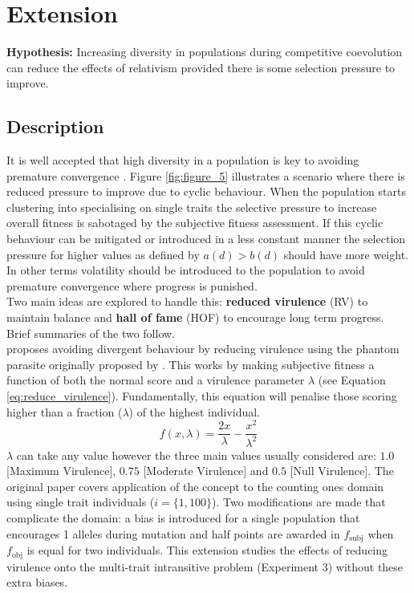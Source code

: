 \documentclass[11pt,a4paper]{article}
\begin{document}
\section{Extension}
\noindent \textbf{Hypothesis:} Increasing diversity in populations during competitive coevolution can reduce the effects of relativism provided there is some selection pressure to improve. \\

\subsection{Description}
It is well accepted that high diversity in a population is key to avoiding premature convergence \parencite{Chong:2009}. Figure \ref{fig:figure_5} illustrates a scenario where there is reduced pressure to improve due to cyclic behaviour. When the population starts clustering into specialising on single traits the selective pressure to increase overall fitness is sabotaged by the subjective fitness assessment. If this cyclic behaviour can be mitigated or introduced in a less constant manner the selection pressure for higher values as defined by $a(d) > b(d)$ should have more weight. In other terms volatility should be introduced to the population to avoid premature convergence where progress is punished.\\

\noindent Two main ideas are explored to handle this: \textbf{reduced virulence} (RV) to maintain balance and \textbf{hall of fame} (HOF) to encourage long term progress. Brief summaries of the two follow.\\

\noindent \cite{Cartlidge:2004} proposes avoiding divergent behaviour by reducing virulence using the phantom parasite originally proposed by \cite{Rosin:1997}. This works by making subjective fitness a function of both the normal score and a virulence parameter $\lambda$ (see Equation \ref{eq:reduce_virulence}). Fundamentally, this equation will penalise those scoring higher than a fraction ($\lambda$) of the highest individual.
\begin{equation}
\label{eq:reduce_virulence}
    f(x, \lambda) = \frac{2x}{\lambda}-\frac{x^2}{\lambda^2}
\end{equation}
\noindent $\lambda$ can take any value however the three main values usually considered are: $1.0$ [Maximum Virulence], $0.75$ [Moderate Virulence] and $0.5$ [Null Virulence]. The original paper covers application of the concept to the counting ones domain using single trait individuals ($i=\{1,100\}$). Two modifications are made that complicate the domain: a bias is introduced for a single population that encourages 1 alleles during mutation and half points are awarded in $f_\text{subj}$ when $f_\text{obj}$ is equal for two individuals. This extension studies the effects of reducing virulence onto the multi-trait intransitive problem (Experiment 3) without these extra biases.\\
\end{document}
